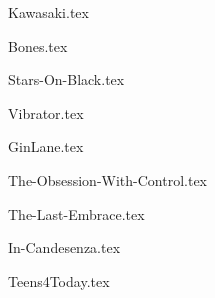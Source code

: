 \begin{songs}{}

  {Kawasaki.tex}
  \sclearpage

  {Bones.tex}
  \sclearpage

  {Stars-On-Black.tex}
  \sclearpage
  
  {Vibrator.tex}
  \sclearpage
  
  {GinLane.tex}
  \sclearpage

  {The-Obsession-With-Control.tex}
  \sclearpage

  {The-Last-Embrace.tex}
  \sclearpage

  {In-Candesenza.tex}
  \sclearpage

  {Teens4Today.tex}
  \sclearpage
\end{songs}
